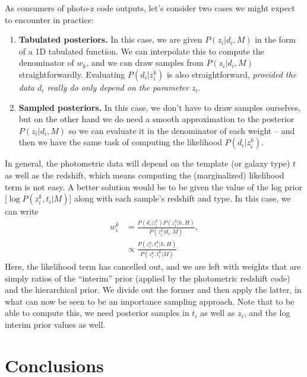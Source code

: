 \documentclass[11pt]{amsart}
\begin{document}
As consumers of photo-z code outputs, let's consider two cases we might
expect to encounter in practice:
\begin{enumerate}
    \item {\bf Tabulated posteriors.} In this case, we are given
    $P(z_i|d_i,M)$ in the form of a 1D tabulated function. We can
    interpolate this to compute the denominator of $w_k$, and we can
    draw samples from $P(z_i|d_i,M)$ straightforwardly. Evaluating
    $P(d_i|z_i^k)$ is also straightforward, {\it provided the data $d_i$
    really do only depend on the parameter $z_i$}.

    \item {\bf Sampled posteriors.} In this case, we don't have to draw
    samples ourselves, but on the other hand we do need a smooth
    approximation to the posterior $P(z_i|d_i,M)$ so we can evaluate it
    in the denominator of each weight -- and then we have the same task
    of computing the likelihood $P(d_i|z_i^k)$.
\end{enumerate}

In general, the photometric data will depend on the template (or galaxy
type) $t$ as well as the redshift, which means computing the
(marginalized) likelihood term is not easy. A better solution would be
to be given the value of the log prior [$\log P(z_i^k,t_i|M)$] along
with each sample's redshift and type. In this case, we can write
\begin{align}
   w_i^k &= \frac{P(d_i|z_i^k) P(z_i^k|h,H)} {P(z_i^k|d_i,M)}, \\
         &\propto \frac{P(z_i^k,t_i^k|h,H)} {P(z_i^k,t_i^k|M)}
\end{align}
Here, the likelihood term has cancelled out, and we are left with
weights that are simply ratios of the ``interim'' prior (applied by the
photometric redshift code) and the hierarchical prior. We divide out the
former and then apply the latter, in what can now be seen to be an
importance sampling approach. Note that to be able to compute this, we
need posterior samples in $t_i$ as well as $z_i$, and the log interim
prior values as well.



\section{Conclusions}
\end{document}
